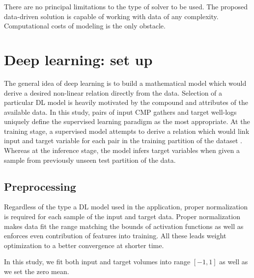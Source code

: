 \documentclass[manuscript]{geophysics}
\begin{document}
There are no principal limitations to the type of solver to be used. The proposed data-driven solution is capable of working with data of any complexity. Computational costs of modeling is the only obstacle.




\section{Deep learning: set up}
The general idea of deep learning is to build a mathematical model which would derive a desired non-linear relation directly from the data. Selection of a particular DL model is heavily motivated by the compound and attributes of the available data. 
In this study, pairs of input CMP gathers and target well-logs  uniquely define the supervised learning paradigm as the most appropriate. At the training stage, a supervised model attempts to derive a relation which would link input and target variable for each pair in the training partition of the dataset . Whereas at the inference stage, the model infers target variables when given a sample from previously unseen test partition of the data.

\subsection{Preprocessing}
Regardless of the type a DL model used in the application, proper normalization is required for each sample of the input and target data. Proper normalization makes data fit the range matching the bounds of activation functions as well as enforces even contribution of features into training. All these leads weight optimization to a better convergence at shorter time.

In this study, we fit both input and target volumes into range $[-1, 1]$ as well as we set the zero mean.

\end{document}
